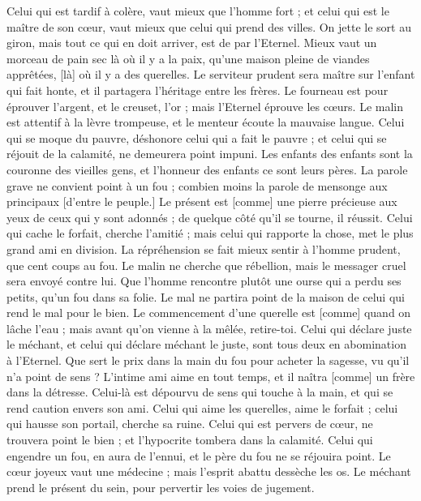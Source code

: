 \begin{multicols}{2}
Celui qui est tardif à colère, vaut mieux que l'homme fort ; et celui qui est le maître de son cœur, vaut mieux que celui qui prend des villes.
On jette le sort au giron, mais tout ce qui en doit arriver, est de par l'Eternel.
\VerseOne{}Mieux vaut un morceau de pain sec là où il y a la paix, qu'une maison pleine de viandes apprêtées, [là] où il y a des querelles.
Le serviteur prudent sera maître sur l'enfant qui fait honte, et il partagera l'héritage entre les frères.
Le fourneau est pour éprouver l'argent, et le creuset, l'or ; mais l'Eternel éprouve les cœurs.
Le malin est attentif à la lèvre trompeuse, et le menteur écoute la mauvaise langue.
Celui qui se moque du pauvre, déshonore celui qui a fait le pauvre ; et celui qui se réjouit de la calamité, ne demeurera point impuni.
Les enfants des enfants sont la couronne des vieilles gens, et l'honneur des enfants ce sont leurs pères.
La parole grave ne convient point à un fou ; combien moins la parole de mensonge aux principaux [d'entre le peuple.]
Le présent est [comme] une pierre précieuse aux yeux de ceux qui y sont adonnés ; de quelque côté qu'il se tourne, il réussit.
Celui qui cache le forfait, cherche l'amitié ; mais celui qui rapporte la chose, met le plus grand ami en division.
La répréhension se fait mieux sentir à l'homme prudent, que cent coups au fou.
Le malin ne cherche que rébellion, mais le messager cruel sera envoyé contre lui.
Que l'homme rencontre plutôt une ourse qui a perdu ses petits, qu'un fou dans sa folie.
Le mal ne partira point de la maison de celui qui rend le mal pour le bien.
Le commencement d'une querelle est [comme] quand on lâche l'eau ; mais avant qu'on vienne à la mêlée, retire-toi.
Celui qui déclare juste le méchant, et celui qui déclare méchant le juste, sont tous deux en abomination à l'Eternel.
Que sert le prix dans la main du fou pour acheter la sagesse, vu qu'il n'a point de sens ?
L'intime ami aime en tout temps, et il naîtra [comme] un frère dans la détresse.
Celui-là est dépourvu de sens qui touche à la main, et qui se rend caution envers son ami.
Celui qui aime les querelles, aime le forfait ; celui qui hausse son portail, cherche sa ruine.
Celui qui est pervers de cœur, ne trouvera point le bien ; et l'hypocrite tombera dans la calamité.
Celui qui engendre un fou, en aura de l'ennui, et le père du fou ne se réjouira point.
Le cœur joyeux vaut une médecine ; mais l'esprit abattu dessèche les os.
Le méchant prend le présent du sein, pour pervertir les voies de jugement.

\end{multicols}
